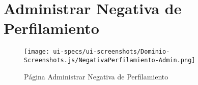 \section{Administrar Negativa de Perfilamiento} \label{sec:cf-ui-admin-negativaperfilamiento}

\begin{figure}[H]
        \label{tab:ui-search-negativaperfilamiento-page}
        \texttt{[image: ui-specs/ui-screenshots/Dominio-Screenshots.js/NegativaPerfilamiento-Admin.png]}
        \caption{P\'agina Administrar Negativa de Perfilamiento}
\end{figure}

